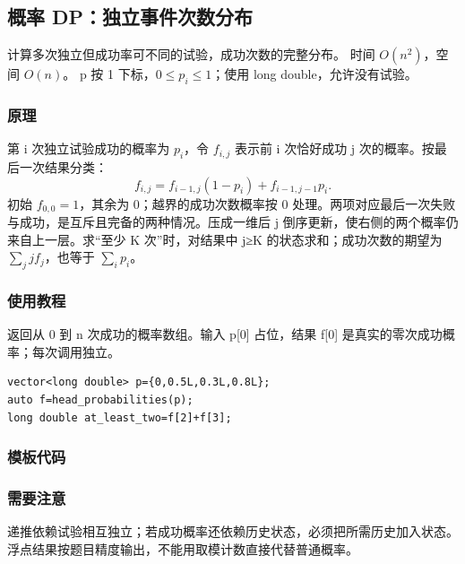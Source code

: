\subsection{概率 DP：独立事件次数分布}
\label{dp:probability-dp}
\AlgorithmInfo
    {计算多次独立但成功率可不同的试验，成功次数的完整分布。}
    {时间 $O(n^2)$，空间 $O(n)$。}
    {p 按 1 下标，$0\le p_i\le1$；使用 long double，允许没有试验。}
\subsubsection*{原理}

第 i 次独立试验成功的概率为 $p_i$，令 $f_{i,j}$ 表示前 i 次恰好成功 j 次的概率。按最后一次结果分类：
\[
 f_{i,j}=f_{i-1,j}(1-p_i)+f_{i-1,j-1}p_i.
\]
初始 $f_{0,0}=1$，其余为 0；越界的成功次数概率按 0 处理。两项对应最后一次失败与成功，是互斥且完备的两种情况。压成一维后 j 倒序更新，使右侧的两个概率仍来自上一层。求“至少 K 次”时，对结果中 j≥K 的状态求和；成功次数的期望为 $\sum_j j f_j$，也等于 $\sum_i p_i$。

\subsubsection*{使用教程}
 返回从 0 到 n 次成功的概率数组。输入 p[0] 占位，结果 f[0] 是真实的零次成功概率；每次调用独立。
\begin{lstlisting}[style=mtycpp,numbers=none]
vector<long double> p={0,0.5L,0.3L,0.8L};
auto f=head_probabilities(p);
long double at_least_two=f[2]+f[3];
\end{lstlisting}
\subsubsection*{模板代码}
\subsubsection*{需要注意}
递推依赖试验相互独立；若成功概率还依赖历史状态，必须把所需历史加入状态。浮点结果按题目精度输出，不能用取模计数直接代替普通概率。
